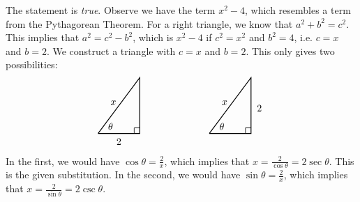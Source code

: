 \documentclass[11pt,letterpaper]{article}
\begin{document}
\sol The statement is \textit{true}. Observe we have the term $x^2 - 4$, which resembles a term from the Pythagorean Theorem. For a right triangle, we know that $a^2 + b^2= c^2$. This implies that $a^2= c^2 - b^2$, which is $x^2 - 4$ if $c^2= x^2$ and $b^2= 4$, i.e. $c= x$ and $b= 2$. We construct a triangle with $c= x$ and $b= 2$. This only gives two possibilities:
	\[
	\begin{tikzpicture}
	\draw[line width=0.03cm] (0,0) -- (1.5,0) -- (1.5,2) -- (0,0);
	\draw[line width=0.02cm] (1.3,0) -- (1.3,0.2) -- (1.5,0.2);
	\node at (0.45,0.25) {$\theta$};
	\node at (0.55,1.1) {$x$};
	\node at (0.75,-0.3) {$2$};
	
	\tikzset{shift={(4,0)}}

	\draw[line width=0.03cm] (0,0) -- (1.5,0) -- (1.5,2) -- (0,0);
	\draw[line width=0.02cm] (1.3,0) -- (1.3,0.2) -- (1.5,0.2);
	\node at (0.45,0.25) {$\theta$};
	\node at (0.55,1.1) {$x$};
	\node at (1.8,0.9) {$2$};
	\end{tikzpicture}
	\]
In the first, we would have $\cos \theta= \frac{2}{x}$, which implies that $x= \frac{2}{\cos \theta}= 2 \sec \theta$. This is the given substitution. In the second, we would have $\sin \theta= \frac{2}{x}$, which implies that $x= \frac{2}{\sin \theta}= 2 \csc \theta$. 
\end{document}
